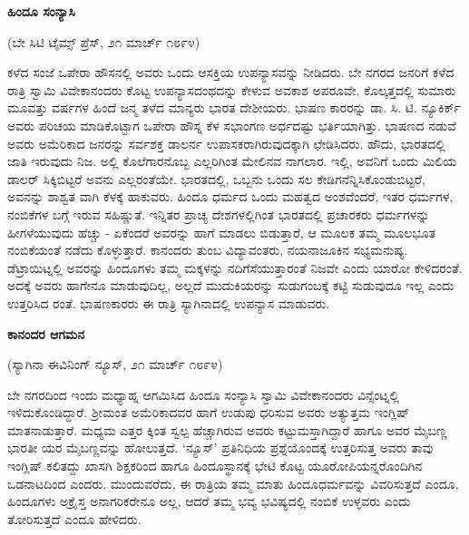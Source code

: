 \begin{center}
\textbf{ಹಿಂದೂ ಸಂನ್ಯಾಸಿ}
\end{center}

\begin{center}
(ಬೇ ಸಿಟಿ ಟೈಮ್ಸ್ ಪ್ರೆಸ್, ೨೧ ಮಾರ್ಚ್ ೧೮೯೪)
\end{center}

ಕಳೆದ ಸಂಜೆ ಒಪೇರಾ ಹೌಸನಲ್ಲಿ ಅವರು ಒಂದು ಆಸಕ್ತಿಯ ಉಪನ್ಯಾಸವನ್ನು ನೀಡಿದರು. ಬೇ ನಗರದ ಜನರಿಗೆ ಕಳೆದ ರಾತ್ರಿ ಸ್ವಾಮಿ ವಿವೇಕಾನಂದರು ಕೊಟ್ಟ ಉಪನ್ಯಾಸದಂಥದನ್ನು ಕೇಳುವ ಅವಕಾಶ ಅಪರೂವೇ. ಕೊಲ್ಕತ್ತದಲ್ಲಿ ಸುಮಾರು ಮೂವತ್ತು ವರ್ಷಗಳ ಹಿಂದೆ ಜನ್ಮ ತಳೆದ ಮಾನ್ಯರು ಭಾರತ ದೇಶೀಯರು. ಭಾಷಣ ಕಾರರನ್ನು ಡಾ. ಸಿ. ಟಿ. ನ್ಯೂಕಿರ್ಕ್ ಅವರು ಪರಿಚಯ ಮಾಡಿಕೊಟ್ಟಾಗ ಒಪೇರಾ ಹೌಸ್ನ ಕೆಳ ಸಭಾಂಗಣ ಅರ್ಧದಷ್ಟು ಭರ್ತಿಯಾಗಿತ್ತು. ಭಾಷಣದ ನಡುವೆ ಅವರು ಅಮೆರಿಕಾದ ಜನರನ್ನು ಸರ್ವಶಕ್ತ ಡಾಲರ್ನ ಉಪಾಸಕರಾಗಿರುವುದಕ್ಕಾಗಿ ಛೇಡಿಸಿದರು. ಹೌದು, ಭಾರತದಲ್ಲಿ ಜಾತಿ ಇರುವುದು ನಿಜ. ಅಲ್ಲಿ ಕೊಲೆಗಾರನೊಬ್ಬ ಎಲ್ಲರಿಗಿಂತ ಮೇಲಿನವ ನಾಗಲಾರ. ಇಲ್ಲಿ, ಅವನಿಗೆ ಒಂದು ಮಿಲಿಯ ಡಾಲರ್ ಸಿಕ್ಕಿಬಿಟ್ಟರೆ ಅವನು ಎಲ್ಲರಂತೆಯೇ. ಭಾರತದಲ್ಲಿ, ಒಬ್ಬನು ಒಂದು ಸಲ ಕೇಡಿಗನೆನ್ನಿಸಿಕೊಂಡುಬಿಟ್ಟರೆ, ಅವನನ್ನು ಶಾಶ್ವತ ವಾಗಿ ಕೆಳಕ್ಕೆ ಹಾಕುವರು. ಹಿಂದೂ ಧರ್ಮದ ಒಂದು ಮಹತ್ವದ ಅಂಶವೆಂದರೆ, ಇತರ ಧರ್ಮಗಳ, ನಂಬಿಕೆಗಳ ಬಗ್ಗೆ ಇರುವ ಸಹಿಷ್ಣುತೆ. ಇನ್ನಿತರ ಪ್ರಾಚ್ಯ ದೇಶಗಳಲ್ಲಿಗಿಂತ ಭಾರತದಲ್ಲಿ ಪ್ರಚಾರಕರು ಧರ್ಮಗಳನ್ನು ಹೀಗಳೆಯುವುದು ಹೆಚ್ಚು - ಏಕೆಂದರೆ ಅವರನ್ನು ಹಾಗೆ ಮಾಡಲು ಬಿಡುತ್ತಾರೆ, ಆ ಮೂಲಕ ತಮ್ಮ ಮೂಲಭೂತ ನಂಬಿಕೆಯಂತೆ ನಡೆದು ಕೊಳ್ಳುತ್ತಾರೆ. ಕಾನಂದರು ತುಂಬ ವಿದ್ಯಾವಂತರು, ನಯನಾಜೂಕಿನ ಸಭ್ಯಮನುಷ್ಯ. ಡೆಟ್ರಾಯಿಟ್ನಲ್ಲಿ ಅವರನ್ನು ಹಿಂದೂಗಳು ತಮ್ಮ ಮಕ್ಕಳನ್ನು ನದಿಗೆಸೆಯುತ್ತಾರಂತೆ ನಿಜವೇ ಎಂದು ಯಾರೋ ಕೇಳಿದರಂತೆ. ಅದಕ್ಕೆ ಅವರು ಹಾಗೇನೂ ಮಾಡುವುದಿಲ್ಲ, ಅಲ್ಲದೆ ಮುದುಕಿಯರನ್ನು ಸುಡುಗಂಬಕ್ಕೆ ಕಟ್ಟಿ ಸುಡುವುದೂ ಇಲ್ಲ ಎಂದು ಉತ್ತರಿಸಿದ ರಂತೆ. ಭಾಷಣಕಾರರು ಈ ರಾತ್ರಿ ಸ್ಯಾಗಿನಾದಲ್ಲಿ ಉಪನ್ಯಾಸ ಮಾಡುವರು.

\begin{center}
\textbf{ಕಾನಂದರ ಆಗಮನ}
\end{center}

\begin{center}
(ಸ್ಯಾಗಿನಾ ಈವಿನಿಂಗ್ ನ್ಯೂಸ್, ೨೧ ಮಾರ್ಚ್ ೧೮೯೪)
\end{center}

ಬೇ ನಗರದಿಂದ ಇಂದು ಮಧ್ಯಾಹ್ನ ಆಗಮಿಸಿದ ಹಿಂದೂ ಸಂನ್ಯಾಸಿ ಸ್ವಾಮಿ ವಿವೇಕಾನಂದರು ವಿನ್ಸೆಂಟ್ನಲ್ಲಿ ಇಳಿದುಕೊಂಡಿದ್ದಾರೆ. ಶ‍್ರೀಮಂತ ಅಮೆರಿಕಾದವರ ಹಾಗೆ ಉಡುಪು ಧರಿಸುವ ಅವರು ಅತ್ಯುತ್ತಮ ಇಂಗ್ಲಿಷ್ ಮಾತನಾಡುತ್ತಾರೆ. ಮಧ್ಯಮ ಎತ್ತರ ಕ್ಕಿಂತ ಸ್ವಲ್ಪ ಹೆಚ್ಚಾಗಿರುವ ಅವರು ಕಟ್ಟುಮಸ್ತಾಗಿದ್ದಾರೆ ಹಾಗೂ ಅವರ ಮೈಬಣ್ಣ ಭಾರತೀ ಯರ ಮೈಬಣ್ಣವನ್ನು ಹೋಲುತ್ತದೆ. ‘ನ್ಯೂಸ್’ ಪ್ರತಿನಿಧಿಯ ಪ್ರಶ್ನೆಯೊಂದಕ್ಕೆ ಉತ್ತರಿಸುತ್ತ ಅವರು ತಾವು ಇಂಗ್ಲಿಷ್ ಕಲಿತದ್ದು ಖಾಸಗಿ ಶಿಕ್ಷಕರಿಂದ ಹಾಗೂ ಹಿಂದೂಸ್ಥಾನಕ್ಕೆ ಭೇಟಿ ಕೊಟ್ಟ ಯೂರೋಪಿಯನ್ನರೊಂದಿಗಿನ ಒಡನಾಟದಿಂದ ಎಂದರು. ಮುಂದುವರೆದು, ಈ ರಾತ್ರಿಯ ತಮ್ಮ ಮಾತು ಹಿಂದೂಧರ್ಮವನ್ನು ವಿವರಿಸುತ್ತದೆ ಎಂದೂ, ಹಿಂದೂಗಳು ಅಕ್ರೈಸ್ತ ಅನಾಗರಿಕರೇನೂ ಅಲ್ಲ, ಆದರೆ ತಮ್ಮ ಭವ್ಯ ಭವಿಷ್ಯದಲ್ಲಿ ನಂಬಿಕೆ ಉಳ್ಳವರು ಎಂದು ತೋರಿಸುತ್ತದೆ ಎಂದೂ ಹೇಳಿದರು.

